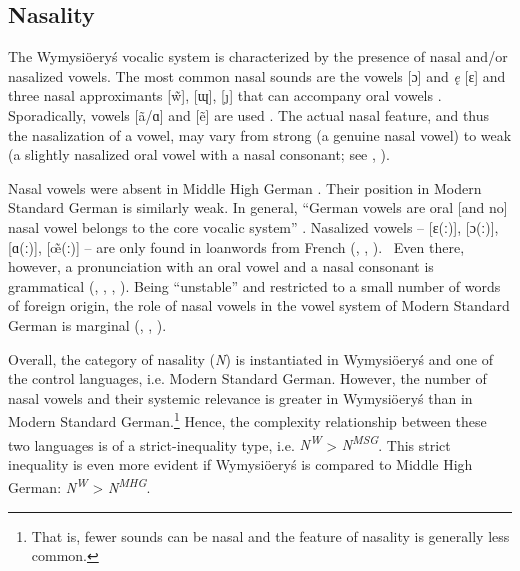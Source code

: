 \documentclass[output=paper,hidelinks]{langscibook}
\begin{document}
\subsection{Nasality}\label{sec:wymsorys:3.6}


The Wymysiöeryś vocalic system is characterized by the presence of nasal and/or nasalized vowels. The most common nasal sounds are the vowels [ɔ] and \textit{ę} [ɛ] and three nasal approximants [\~{w}], [ɰ], [ȷ] that can accompany oral vowels \citep{Andrason2021}. Sporadically, vowels [ã/ɑ] and [ẽ] are used \citep{Andrason2021}. The actual nasal feature, and thus the nasalization of a vowel, may vary from strong (a genuine nasal vowel) to weak (a slightly nasalized oral vowel with a nasal consonant; see \citealt[12]{kleczkowski_dialekt_1920}, \citealt[xiii]{mojmir_worterbuch}).

Nasal vowels were absent in Middle High German \citep{wright_middle_1917, paul_mittelhochdeutsche_2007, de_boor_mittelhochdeutsche_1973}. Their position in Modern Standard German is similarly weak. In general, ``German vowels are oral [and no] nasal vowel belongs to the core vocalic system'' \citep[71]{caratini_vocalic_2009}. Nasalized vowels – [ɛ(ː)], [ɔ(ː)], [ɑ(ː)], [\~{œ}(ː)] – are only found in loanwords from French (\citealt[9--10]{fagan_german_2009}, \citealt[51, 73--74]{caratini_vocalic_2009}, \citealt[22]{obrein_german_2016}).%
~Even there, however, a pronunciation with an oral vowel and a nasal consonant is grammatical (\citealt[78]{russ_german_1994}, \citealt[53]{fox_structure_2005}, \citealt[9]{fagan_german_2009}, \citealt[22]{obrein_german_2016}). Being ``unstable'' and restricted to a small number of words of foreign origin, the role of nasal vowels in the vowel system of Modern Standard German is marginal (\citealt[53]{fox_structure_2005}, \citealt[10]{fagan_german_2009}, \citealt[90]{johnson_exploring_2008}). 

Overall, the category of nasality (\textit{N}) is instantiated in Wymysiöeryś and one of the control languages, i.e. Modern Standard German. However, the number of nasal vowels and their systemic relevance is greater in Wymysiöeryś than in Modern Standard German.\footnote{That is, fewer sounds can be nasal and the feature of nasality is generally less common.} Hence, the complexity relationship between these two languages is of a strict-inequality type, i.e. \textit{N\textsuperscript{W}} > \textit{N\textsuperscript{MSG}}. This strict inequality is even more evident if Wymysiöeryś is compared to Middle High German: \textit{N\textsuperscript{W}} > \textit{N\textsuperscript{MHG}}.
\end{document}
